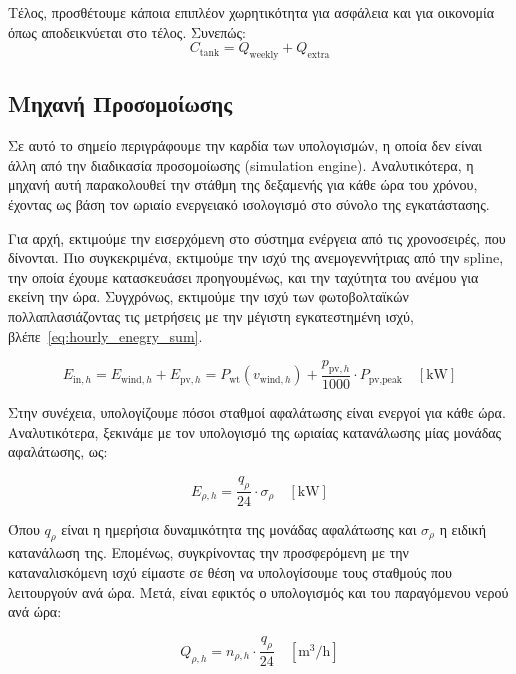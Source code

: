 Τέλος, προσθέτουμε κάποια επιπλέον χωρητικότητα για ασφάλεια και για οικονομία
όπως αποδεικνύεται στο τέλος. Συνεπώς:
\begin{equation}\label{eq:tank_capacity}
	C_{\text{tank}} = Q_{\text{weekly}} + Q_{\text{extra}}
\end{equation}

\subsection{Μηχανή Προσομοίωσης}
Σε αυτό το σημείο περιγράφουμε την καρδία των υπολογισμών, η οποία δεν είναι
άλλη από την διαδικασία προσομοίωσης (simulation engine). Αναλυτικότερα, η
μηχανή αυτή παρακολουθεί την στάθμη της δεξαμενής για κάθε ώρα του χρόνου,
έχοντας ως βάση τον ωριαίο ενεργειακό ισολογισμό στο σύνολο της εγκατάστασης.

Για αρχή, εκτιμούμε την εισερχόμενη στο σύστημα ενέργεια από τις χρονοσειρές,
που δίνονται. Πιο συγκεκριμένα, εκτιμούμε την ισχύ της ανεμογεννήτριας από την
spline, την οποία έχουμε κατασκευάσει προηγουμένως, και την ταχύτητα του ανέμου
για εκείνη την ώρα. Συγχρόνως, εκτιμούμε την ισχύ των φωτοβολταϊκών
πολλαπλασιάζοντας τις μετρήσεις με την μέγιστη εγκατεστημένη ισχύ, βλέπε~\eqref{eq:hourly_enegry_sum}.

\begin{equation}\label{eq:hourly_enegry_sum}
	E_{\text{in},h} = E_{\text{wind},h} + E_{\text{pv},h}= P_{\text{wt}} \left(v_{\text{wind},h}\right) + \frac{p_{\text{pv},h}}{1000}\cdot P_{\text{pv,peak}}\quad \left[\si{\kilo\watt}\right]
\end{equation}

Στην συνέχεια, υπολογίζουμε πόσοι σταθμοί αφαλάτωσης είναι ενεργοί για κάθε
ώρα. Αναλυτικότερα, ξεκινάμε με τον υπολογισμό της ωριαίας κατανάλωσης μίας
μονάδας αφαλάτωσης, ως:

\begin{equation}\label{eq:hourly_desalination_consumption}
	E_{\rho ,h}= \frac{q_{\rho}}{24}\cdot \sigma_{\rho}\quad \left[\si{\kilo\watt}\right]
\end{equation}

Όπου \(q_{\rho}\) είναι η ημερήσια δυναμικότητα της μονάδας αφαλάτωσης και
\(\sigma_{\rho}\) η ειδική κατανάλωση της. Επομένως, συγκρίνοντας την
προσφερόμενη με την καταναλισκόμενη ισχύ είμαστε σε θέση να υπολογίσουμε τους
σταθμούς που λειτουργούν ανά ώρα. Μετά, είναι εφικτός ο υπολογισμός και του
παραγόμενου νερού ανά ώρα:

\begin{equation}\label{eq:hourly_desalination_production}
	Q_{\rho , h}=n_{\rho ,h}\cdot \frac{q_{\rho}}{24}\quad \left[\si{\cubic\meter\per\hour}\right]
\end{equation}

